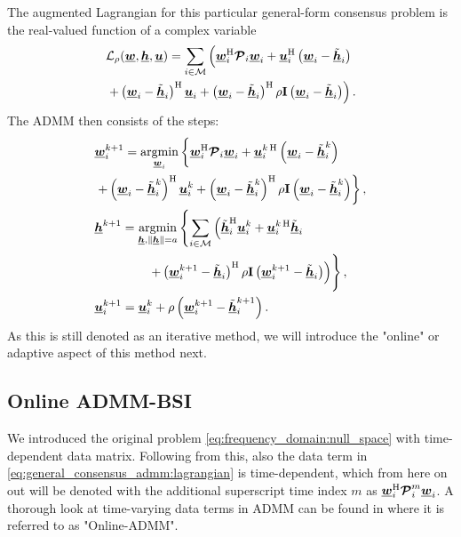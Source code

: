 \documentclass{article}
\newcommand{\hf}{\underline{\bm{h}}}
\newcommand{\wf}{\underline{\bm{w}}}
\newcommand{\uuf}{\underline{\bm{u}}}
\newcommand{\aRhof}{\bm{\mathcal{P}}}
\newcommand{\I}{\mtxb{I}}
\newcommand{\Mset}{\mathcal{M}}
\begin{document}
The augmented Lagrangian for this particular general-form consensus problem is the real-valued function of a complex variable
\begin{align}
    &\mathcal{L}_{\rho} (\wf,\hf,\uuf) = \sum_{i \in \Mset} \left( \wf_i^\herm \aRhof_i \wf_i + \uuf_i^{\herm} \left(\wf_i - \tilde{\hf}_i\right)\vphantom{+ \frac{\rho}{2} \left\| \wf_i - \tilde{\hf}_i \right\|^2} \right.\nonumber\\
    &\left. + \left(\wf_i - \tilde{\hf}_i\right)^\herm \uuf_i + \left( \wf_i - \tilde{\hf}_i \right)^\herm \rho \I \left( \wf_i - \tilde{\hf}_i \right) \right).\label{eq:general_consensus_admm:lagrangian}
\end{align}
The ADMM then consists of the steps:
\begin{align}
    &\wf_i^{k+1} = \underset{\wf_i}{\operatorname{argmin}} \left\{ \wf_i^\herm \aRhof_i \wf_i + \uuf_i^{k\,\herm} \left(\wf_i - \tilde{\hf}_i^{k}\right) \vphantom{+ \left\| \wf_i - \tilde{\hf}_i^{k} \right\|^2}\right.\nonumber\\
    &\left.+ \left(\wf_i - \tilde{\hf}_i^{k}\right)^\herm \uuf_i^{k} + \left( \wf_i - \tilde{\hf}_i^{k} \right)^\herm \rho \I \left( \wf_i - \tilde{\hf}_i^{k} \right) \right\},\label{eq:general_consensus_admm:local}\\
    &\hf^{k+1} = \underset{\hf, \|\hf\| = a}{\operatorname{argmin}} \left\{ \sum_{i \in \Mset} \left( \tilde{\hf}_i^{\herm} \uuf_i^{k} + \uuf_i^{k\,\herm} \tilde{\hf}_i \vphantom{\frac{\rho}{2} \| \wf_i^{k+1} - \tilde{\hf}_i \|^2} \right.\right.\nonumber\\
    &\left. \qquad \qquad \vphantom{\sum_{i=1}^{M} pp } \left.+ \left( \wf_i^{k+1} - \tilde{\hf}_i \right)^\herm \rho \I \left( \wf_i^{k+1} - \tilde{\hf}_i \right)  \right) \right\},\label{eq:general_consensus_admm:global}\\
    &\uuf_i^{k+1} = \uuf_i^{k} + \rho \left( \wf_i^{k+1} - \tilde{\hf}_i^{k+1} \right).\label{eq:general_consensus_admm:dual}
\end{align}
As this is still denoted as an iterative method, we will introduce the "online" or adaptive aspect of this method next.

\subsection{Online ADMM-BSI}
\label{ssec:online_admm}
We introduced the original problem \eqref{eq:frequency_domain:null_space} with time-dependent data matrix. Following from this, also the data term in \eqref{eq:general_consensus_admm:lagrangian} is time-dependent, which from here on out will be denoted with the additional superscript time index \(m\) as \(\wf_i^\herm \aRhof_i^{m} \wf_i\).
A thorough look at time-varying data terms in ADMM can be found in \cite{wangOnlineAlternatingDirection2013,hosseiniOnlineDistributedADMM2014} where it is referred to as "Online-ADMM".
\end{document}
